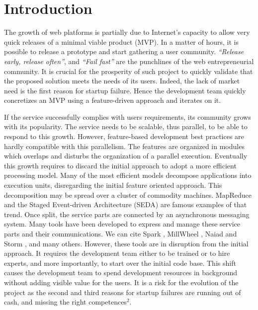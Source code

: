\section{Introduction}

The growth of web platforms is partially due to Internet's capacity to allow very quick releases of a minimal viable product (MVP).
In a matter of hours, it is possible to release a prototype and start gathering a user community.
\textit{``Release early, release often''}, and \textit{``Fail fast''} are the punchlines of the web entrepreneurial community.
It is crucial for the prosperity of such project to quickly validate that the proposed solution meets the needs of its users.
Indeed, the lack of market need is the first reason for startup failure.
Hence the development team quickly concretizes an MVP using a feature-driven approach and iterates on it.

If the service successfully complies with users requirements, its community grows with its popularity.
The service needs to be scalable, thus parallel, to be able to respond to this growth.
However, feature-based development best practices are hardly compatible with this parallelism.
The features are organized in modules which overlaps and disturbs the organization of a parallel execution.
Eventually this growth requires to discard the initial approach to adopt a more efficient processing model.
Many of the most efficient models decompose applications into execution units, disregarding the initial feature oriented approach.
This decomposition may be spread over a cluster of commodity machines. %
MapReduce \cite{Dean2008} and the Staged Event-driven Architecture (SEDA) \cite{Welsh2000} are famous examples of that trend. %
Once split, the service parts are connected by an asynchronous messaging system.
Many tools have been developed to express and manage these service parts and their communications.
We can cite Spark \cite{Zaharia2012}, MillWheel \cite{Akidau2013}, Naiad \cite{McSherry} and Storm \cite{Toshniwal2014}, and many others.
However, these tools are in disruption from the initial approach.
It requires the development team either to be trained or to hire experts, and more importantly, to start over the initial code base.
This shift causes the development team to spend development resources in background without adding visible value for the users.
It is a risk for the evolution of the project as the second and third reasons for startup failures are running out of cash, and missing the right competences$^2$.

